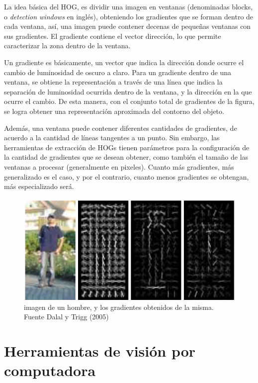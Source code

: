 \documentclass[a4paper,12pt,oneside,spanish]{book}
\begin{document}
La idea básica del HOG, es dividir una imagen en ventanas (denominadas blocks, o \textit{detection windows} en inglés), obteniendo los gradientes que se forman dentro de cada ventana, así, una imagen puede contener decenas de pequeñas ventanas con sus gradientes. El gradiente contiene el vector dirección, lo que permite caracterizar la zona dentro de la ventana.\par

Un gradiente es básicamente, un vector que indica la dirección donde ocurre el cambio de luminosidad de oscuro a claro. Para un gradiente dentro de una ventana, se obtiene la representación a través de una línea que indica la separación de luminosidad ocurrida dentro de la ventana, y la dirección en la que ocurre el cambio. De esta manera, con el conjunto total de gradientes de la figura, se logra obtener una representación aproximada del contorno del objeto.\par

Además, una ventana puede contener diferentes cantidades de gradientes, de acuerdo a la cantidad de líneas tangentes a un punto. Sin embargo, las herramientas de extracción de HOGs tienen parámetros para la configuración de la cantidad de gradientes que se desean obtener, como también el tamaño de las ventanas a procesar (generalmente en pixeles). Cuanto más gradientes, más generalizado es el caso, y por el contrario, cuanto menos gradientes se obtengan, más especializado será.\par

\begin{figure}[h!]
	\includegraphics[width=340pt]{Imagenes/hog1.jpg}
	\centering
	\caption{imagen de un hombre, y los gradientes obtenidos de la misma. Fuente Dalal y Trigg (2005) }
	\label{fig:hog1}
\end{figure}
 

\section{Herramientas de visión por computadora}\label{herramientasdevisionporcomputadora}
\end{document}
